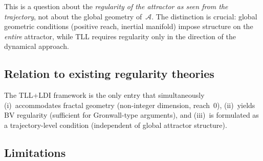 \documentclass[12pt,a4paper]{article}
\theoremstyle{definition}
\theoremstyle{plain}
\theoremstyle{remark}
\begin{document}
\noindent
This is a question about the \emph{regularity of the attractor as
seen from the trajectory}, not about the global geometry
of~$\mathcal{A}$.  The distinction is crucial: global geometric
conditions (positive reach, inertial manifold) impose structure
on the \emph{entire} attractor, while TLL requires regularity
only in the direction of the dynamical approach.

\subsection{Relation to existing regularity theories}

\begin{center}
\end{center}

\noindent
The TLL+LDI framework is the only entry that simultaneously
(i)~accommodates fractal geometry (non-integer dimension, reach~$0$),
(ii)~yields BV regularity (sufficient for Gronwall-type arguments),
and (iii)~is formulated as a trajectory-level condition
(independent of global attractor structure).

\subsection{Limitations}
\end{document}
